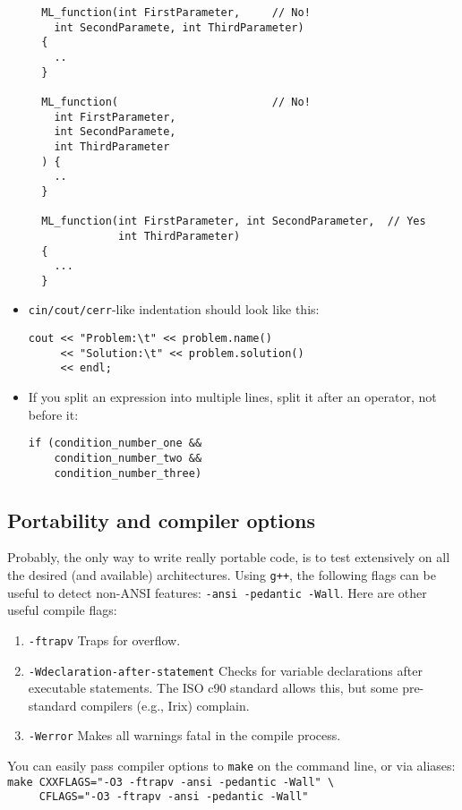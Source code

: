 \documentclass[10pt,letter,relax]{SANDreport}
\newcommand{\be}     {\begin{enumerate}}
\newcommand{\ee}     {\end{enumerate}}
\begin{document}
\begin{itemize}
  \begin{verbatim}
  ML_function(int FirstParameter,     // No!
    int SecondParamete, int ThirdParameter)
  {
    ..
  }

  ML_function(                        // No!
    int FirstParameter,
    int SecondParamete,
    int ThirdParameter
  ) {
    ..
  }    

  ML_function(int FirstParameter, int SecondParameter,  // Yes
              int ThirdParameter)
  {
    ...
  }      
  \end{verbatim}
\item \verb!cin/cout/cerr!-like indentation should look like this:
\begin{verbatim}
cout << "Problem:\t" << problem.name()
     << "Solution:\t" << problem.solution()
     << endl;
\end{verbatim}
\item If you split an expression into multiple lines, split it after an operator, not before it:
\begin{verbatim}
if (condition_number_one &&
    condition_number_two &&
    condition_number_three)
\end{verbatim}
\end{itemize}

\subsection{Portability and compiler options}

Probably, the only way to write really portable code, is to test
extensively on all the desired (and available) architectures. Using
\verb!g++!, the following flags can be useful to detect non-ANSI
features: \verb!-ansi -pedantic -Wall!.
Here are other useful compile flags:
\be
  \item {\tt -ftrapv} Traps for overflow.
  \item {\tt -Wdeclaration-after-statement} Checks for variable declarations
after executable statements.  The ISO c90 standard allows this, but some
pre-standard compilers (e.g., Irix) complain.
  \item {\tt -Werror} Makes all warnings fatal in the compile process.
\ee
You can easily pass compiler options to {\tt make} on the command line, or via
aliases:\\
\verb!make CXXFLAGS="-O3 -ftrapv -ansi -pedantic -Wall" \!\\
\verb!     CFLAGS="-O3 -ftrapv -ansi -pedantic -Wall"!
\end{document}
